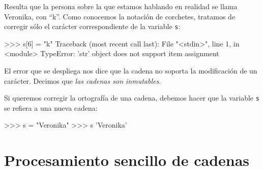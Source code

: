 Resulta que la persona sobre la que estamos hablando en realidad se llama
Veronika, con ``k''.  Como conocemos la notación de corchetes,
tratamos de corregir sólo el carácter correspondiente de la variable
\lstinline!s!:

\begin{codigo-python-sn}
>>> s[6] = "k"
Traceback (most recent call last):
  File "<stdin>", line 1, in <module>
TypeError: 'str' object does not support item assignment
\end{codigo-python-sn}

El error que se despliega nos dice que la cadena no soporta
la modificación de un carácter. Decimos que {\it las cadenas
son inmutables}.

Si queremos corregir la ortografía de una cadena, debemos hacer
que la variable \lstinline!s! se refiera a una nueva cadena:

\begin{codigo-python-sn}
>>> s = "Veronika"
>>> s
'Veronika'
\end{codigo-python-sn}

\section{Procesamiento sencillo de cadenas}


